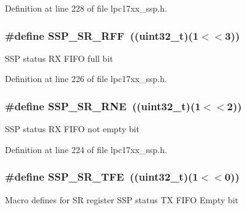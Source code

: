 \-Definition at line 228 of file lpc17xx\-\_\-ssp.\-h.

\hypertarget{group___s_s_p___private___macros_gacb3442f8b9ec2dbb3be63f154cc58940}{
\subsubsection[{\-S\-S\-P\-\_\-\-S\-R\-\_\-\-R\-F\-F}]{\setlength{\rightskip}{0pt plus 5cm}\#define {\bf \-S\-S\-P\-\_\-\-S\-R\-\_\-\-R\-F\-F}~((uint32\-\_\-t)(1$<$$<$3))}}\label{group___s_s_p___private___macros_gacb3442f8b9ec2dbb3be63f154cc58940}
\-S\-S\-P status \-R\-X \-F\-I\-F\-O full bit 

\-Definition at line 226 of file lpc17xx\-\_\-ssp.\-h.

\hypertarget{group___s_s_p___private___macros_ga67740be98d73a50bf341ca3e2c25da6e}{
\subsubsection[{\-S\-S\-P\-\_\-\-S\-R\-\_\-\-R\-N\-E}]{\setlength{\rightskip}{0pt plus 5cm}\#define {\bf \-S\-S\-P\-\_\-\-S\-R\-\_\-\-R\-N\-E}~((uint32\-\_\-t)(1$<$$<$2))}}\label{group___s_s_p___private___macros_ga67740be98d73a50bf341ca3e2c25da6e}
\-S\-S\-P status \-R\-X \-F\-I\-F\-O not empty bit 

\-Definition at line 224 of file lpc17xx\-\_\-ssp.\-h.

\hypertarget{group___s_s_p___private___macros_gaa56cadbf2604cf3d9706f3583be99f63}{
\subsubsection[{\-S\-S\-P\-\_\-\-S\-R\-\_\-\-T\-F\-E}]{\setlength{\rightskip}{0pt plus 5cm}\#define {\bf \-S\-S\-P\-\_\-\-S\-R\-\_\-\-T\-F\-E}~((uint32\-\_\-t)(1$<$$<$0))}}\label{group___s_s_p___private___macros_gaa56cadbf2604cf3d9706f3583be99f63}
\-Macro defines for \-S\-R register \-S\-S\-P status \-T\-X \-F\-I\-F\-O \-Empty bit 

